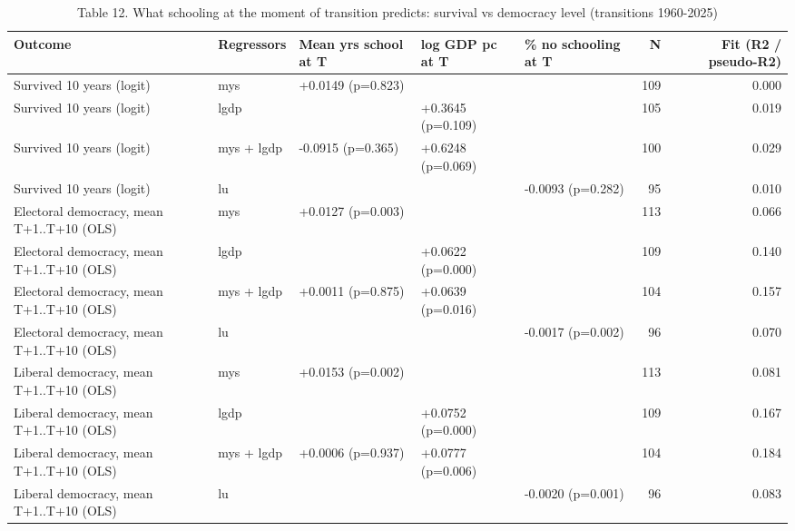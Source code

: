 \begin{table}
\caption{Table 12. What schooling at the moment of transition predicts: survival vs democracy level (transitions 1960-2025)}
\label{tab:T12_after_transition}
\begin{tabular}{lllllrr}
\toprule
Outcome & Regressors & Mean yrs school at T & log GDP pc at T & \% no schooling at T & N & Fit (R2 / pseudo-R2) \\
\midrule
Survived 10 years (logit) & mys & +0.0149 (p=0.823) &  &  & 109 & 0.000 \\
Survived 10 years (logit) & lgdp &  & +0.3645 (p=0.109) &  & 105 & 0.019 \\
Survived 10 years (logit) & mys + lgdp & -0.0915 (p=0.365) & +0.6248 (p=0.069) &  & 100 & 0.029 \\
Survived 10 years (logit) & lu &  &  & -0.0093 (p=0.282) & 95 & 0.010 \\
Electoral democracy, mean T+1..T+10 (OLS) & mys & +0.0127 (p=0.003) &  &  & 113 & 0.066 \\
Electoral democracy, mean T+1..T+10 (OLS) & lgdp &  & +0.0622 (p=0.000) &  & 109 & 0.140 \\
Electoral democracy, mean T+1..T+10 (OLS) & mys + lgdp & +0.0011 (p=0.875) & +0.0639 (p=0.016) &  & 104 & 0.157 \\
Electoral democracy, mean T+1..T+10 (OLS) & lu &  &  & -0.0017 (p=0.002) & 96 & 0.070 \\
Liberal democracy, mean T+1..T+10 (OLS) & mys & +0.0153 (p=0.002) &  &  & 113 & 0.081 \\
Liberal democracy, mean T+1..T+10 (OLS) & lgdp &  & +0.0752 (p=0.000) &  & 109 & 0.167 \\
Liberal democracy, mean T+1..T+10 (OLS) & mys + lgdp & +0.0006 (p=0.937) & +0.0777 (p=0.006) &  & 104 & 0.184 \\
Liberal democracy, mean T+1..T+10 (OLS) & lu &  &  & -0.0020 (p=0.001) & 96 & 0.083 \\
\bottomrule
\end{tabular}
\end{table}
